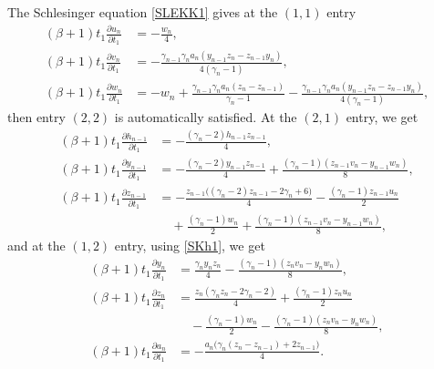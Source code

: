 \documentclass[10pt, reqno]{amsart}
\numberwithin{equation}{section}
\numberwithin{equation}{section}
\begin{document}
The Schlesinger equation \eqref{SLEKK1} gives at the $(1,1)$ entry
\begin{align}
(\beta+1)t_1\frac{\partial u_n}{\partial t_1}&=-\frac{w_n}{4},\label{SKu1}\\
(\beta+1)t_1\frac{\partial v_n}{\partial t_1}&=-\frac{\gamma_{n-1}\gamma_na_n(y_{n-1}z_n-z_{n-1}y_n)}{4(\gamma_n-1)},\label{SKv1}\\
(\beta+1)t_1\frac{\partial w_n}{\partial t_1}&=-w_n+ \frac{\gamma_{n-1}\gamma_n a_n(z_n-z_{n-1})}{\gamma_n-1}
-\frac{\gamma_{n-1}\gamma_na_n(y_{n-1}z_n-z_{n-1}y_n)}{4(\gamma_n-1)},\label{SKw1}
\end{align}
then entry $(2,2)$ is automatically satisfied. At the $(2,1)$ entry, we get
\begin{align}
(\beta+1)t_1\frac{\partial h_{n-1}}{\partial t_1}&=-\frac{(\gamma_n-2)h_{n-1}z_{n-1}}{4},\label{SKh1}\\
(\beta+1)t_1\frac{\partial y_{n-1}}{\partial t_1}&=-\frac{(\gamma_n-2)y_{n-1}z_{n-1}}{4}+\frac{(\gamma_n-1)(z_{n-1}v_n-y_{n-1}w_n)}{8},\nonumber\\
(\beta+1)t_1\frac{\partial z_{n-1}}{\partial t_1}&=-\frac{z_{n-1}\big((\gamma_n-2)z_{n-1}-2\gamma_n+6\big)}{4}-\frac{(\gamma_n-1)z_{n-1}u_n}{2}\nonumber\\
&\quad +\frac{(\gamma_n-1)w_n}{2}+\frac{(\gamma_n-1)(z_{n-1}v_n-y_{n-1}w_n)}{8},\nonumber
\end{align}
and at the $(1,2)$ entry, using \eqref{SKh1}, we get
\begin{align}
(\beta+1)t_1\frac{\partial y_n}{\partial t_1}&=\frac{\gamma_ny_nz_n}{4}-\frac{(\gamma_n-1)(z_nv_n-y_nw_n)}{8},\label{SKy1}\\
(\beta+1)t_1\frac{\partial z_n}{\partial t_1}&=\frac{z_n(\gamma_nz_n-2\gamma_n-2)}{4}+\frac{(\gamma_n-1)z_nu_n}{2}\nonumber\\
&\quad-\frac{(\gamma_n-1)w_n}{2}-\frac{(\gamma_n-1)(z_nv_n-y_nw_n)}{8},\label{SKz1}\\
(\beta+1)t_1\frac{\partial a_n}{\partial t_1}&=-\frac{a_n\big(\gamma_n(z_n-z_{n-1})+2z_{n-1}\big)}{4}.\label{SKa1}
\end{align}
\end{document}
